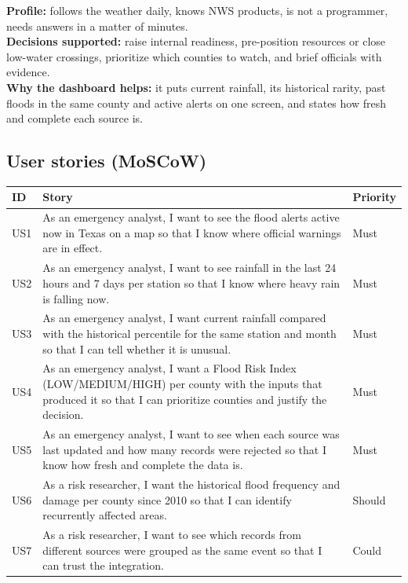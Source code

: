 \documentclass[11pt,letterpaper]{article}
\begin{document}
\textbf{Profile:} follows the weather daily, knows NWS products, is not a programmer, needs answers in a matter of minutes.\\

\textbf{Decisions supported:} raise internal readiness, pre-position resources or close low-water crossings, prioritize which counties to watch, and brief officials with evidence.\\

\textbf{Why the dashboard helps:} it puts current rainfall, its historical rarity, past floods in the same county and active alerts on one screen, and states how fresh and complete each source is.

\subsection{User stories (MoSCoW)}
\begin{longtable}{@{}p{0.6cm}p{11.8cm}p{2cm}@{}}\toprule
ID & Story & Priority\\\midrule\endhead
US1 & As an emergency analyst, I want to see the flood alerts active now in Texas on a map so that I know where official warnings are in effect. & Must\\
US2 & As an emergency analyst, I want to see rainfall in the last 24 hours and 7 days per station so that I know where heavy rain is falling now. & Must\\
US3 & As an emergency analyst, I want current rainfall compared with the historical percentile for the same station and month so that I can tell whether it is unusual. & Must\\
US4 & As an emergency analyst, I want a Flood Risk Index (LOW/MEDIUM/HIGH) per county with the inputs that produced it so that I can prioritize counties and justify the decision. & Must\\
US5 & As an emergency analyst, I want to see when each source was last updated and how many records were rejected so that I know how fresh and complete the data is. & Must\\

US6 & As a risk researcher, I want the historical flood frequency and damage per county since 2010 so that I can identify recurrently affected areas. & Should\\
US7 & As a risk researcher, I want to see which records from different sources were grouped as the same event so that I can trust the integration. & Could\\

\bottomrule\end{longtable}
\end{document}

